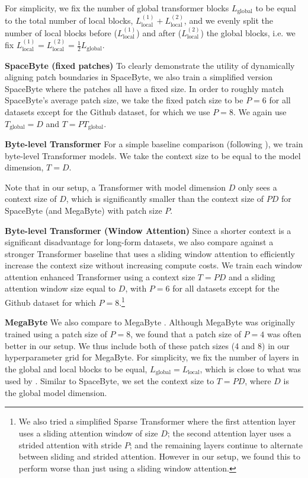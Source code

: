 For simplicity, we fix the number of global transformer blocks $L_\text{global}$ to be equal to the total number of local blocks, $L_\text{local}^{(1)} + L_\text{local}^{(2)}$,
  and we evenly split the number of local blocks before ($L_\text{local}^{(1)}$) and after ($L_\text{local}^{(2)}$) the global blocks, i.e. we fix $L_\text{local}^{(1)} = L_\text{local}^{(2)} = \tfrac{1}{2} L_\text{global}$.

\textbf{SpaceByte (fixed patches)} To clearly demonstrate the utility of dynamically aligning patch boundaries in SpaceByte, we also train a simplified version SpaceByte where the patches all have a fixed size. In order to roughly match SpaceByte's average patch size, we take the fixed patch size to be $P=6$ for all datasets except for the Github dataset, for which we use $P=8$. We again use $T_\text{global} = D$ and $T = P T_\text{global}$.

\textbf{Byte-level Transformer} For a simple baseline comparison (following \citet{megabyte}),
  we train byte-level Transformer models. We take the context size to be equal to the model dimension, $T = D$.

Note that in our setup, a Transformer with model dimension $D$ only sees a context size of $D$, which is significantly smaller than the context size of $PD$ for SpaceByte (and MegaByte) with patch size $P$.

\textbf{Byte-level Transformer (Window Attention)} Since a shorter context is a significant disadvantage for long-form datasets, we also compare against a stronger Transformer baseline that uses a sliding window attention \cite{longformer2020,child2019sparse,press2021shortformer} to efficiently increase the context size without increasing compute costs. We train each window attention enhanced Transformer using a context size $T=PD$ and a sliding attention window size equal to $D$, with $P=6$ for all datasets except for the Github dataset for which $P=8$.\footnote{
    We also tried a simplified Sparse Transformer \cite{child2019sparse} where the first attention layer uses a sliding attention window of size $D$; the second attention layer uses a strided attention with stride $P$; and the remaining layers continue to alternate between sliding and strided attention. However in our setup, we found this to perform worse than just using a sliding window attention.}

\textbf{MegaByte}
We also compare to MegaByte \cite{megabyte}. Although MegaByte was originally trained using a patch size of $P=8$, we found that a patch size of $P=4$ was often better in our setup. We thus include both of these patch sizes (4 and 8) in our hyperparameter grid for MegaByte. For simplicity, we fix the number of layers in the global and local blocks to be equal, $L_\text{global} = L_\text{local}$,
  which is close to what was used by \citet{megabyte}.
Similar to SpaceByte, we set the context size to $T = P D$, where $D$ is the global model dimension.

